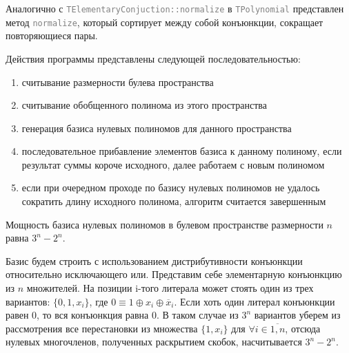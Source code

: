 \documentclass[a4paper,12pt,titlepage,finall]{article}
\newcommand{\code}[1]{\textcolor{gray}{\texttt{#1}}}
\begin{document}
Аналогично с \code{TElementaryConjuction::normalize} в \code{TPolynomial} представлен метод \code{normalize}, который сортирует между собой конъюнкции, сокращает повторяющиеся пары.

Действия программы представлены следующей последовательностью:
\begin{enumerate}
    \item считывание размерности булева пространства
    \item считывание обобщенного полинома из этого пространства
    \item генерация базиса нулевых полиномов для данного пространства
    \item последовательное прибавление элементов базиса к данному полиному, если результат суммы короче исходного, далее работаем с новым полиномом
    \item если при очередном проходе по базису нулевых полиномов не удалось сократить длину исходного полинома, алгоритм считается завершенным
\end{enumerate}

Мощность базиса нулевых полиномов в булевом пространстве размерности $n$ равна $3^n - 2^n$.

Базис будем строить с использованием дистрибутивности конъюнкции относительно исключающего или.
Представим себе элементарную конъюнкцию из $n$ множителей. На позиции i-того литерала может стоять один из трех вариантов: $\{0, 1, x_i \}$, где $0 \equiv 1 \oplus x_i \oplus \overline x_i$. Если хоть один литерал конъюнкции равен 0, то вся конъюнкция равна 0. В таком случае из $3^n$ вариантов уберем из рассмотрения все перестановки из множества $\{1, x_i \}$ для $\forall i \in \overline{1, n}$, отсюда нулевых многочленов, полученных раскрытием скобок, насчитывается $3^n - 2^n$.
\end{document}
